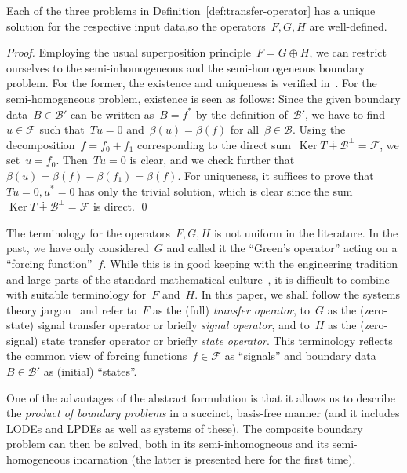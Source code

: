 \documentclass[a4paper]{llncs}
\renewcommand{\ker}{\operatorname{Ker}}
\newcommand{\orth}[1]{#1^\perp}
\newcommand{\galg}{\mathcal{F}}
\newcommand{\bspc}{\mathcal{B}}
\newenvironment{myproof}{\begin{proof}}{\qed\end{proof}}
\begin{document}
\begin{mylemma}
  Each of the three problems in Definition~\ref{def:transfer-operator} has a
  unique solution for the respective input data,so the operators~$F, G, H$ are
  well-defined.
\end{mylemma}
\begin{myproof}
  Employing the usual superposition principle~$F = G \oplus H$, we can restrict
  ourselves to the semi-inhomogeneous and the semi-homogeneous boundary
  problem. For the former, the existence and uniqueness is verified
  in~\cite[\S2]{RegensburgerRosenkranz2009}. For the semi-homogeneous problem,
  existence is seen as follows: Since the given boundary data~$B \in \bspc'$ can
  be written as~$B = f^*$ by the definition of~$\bspc'$, we have to find~$u \in
  \galg$ such that~$Tu=0$ and~$\beta(u) = \beta(f)$ for all~$\beta \in
  \bspc$. Using the decomposition~$f=f_0 + f_1$ corresponding to the direct
  sum~$\ker{T} \dotplus \orth{\bspc} = \galg$, we set~$u = f_0$. Then~$Tu=0$ is
  clear, and we check further that~$\beta(u) = \beta(f)-\beta(f_1) =
  \beta(f)$. For uniqueness, it suffices to prove that~$Tu=0, u^* = 0$ has only
  the trivial solution, which is clear since the sum~$\ker{T} \dotplus
  \orth{\bspc} = \galg$ is direct.
\end{myproof}

The terminology for the operators~$F, G, H$ is not uniform in the literature. In
the past, we have only considered~$G$ and called it the ``Green's operator''
acting on a ``forcing function''~$f$. While this is in good keeping with the
engineering tradition and large parts of the standard mathematical
culture~\cite{Stakgold1979}, it is difficult to combine with suitable
terminology for~$F$ and~$H$. In this paper, we shall follow the systems theory
jargon~\cite{OberstPauer2001} and refer to~$F$ as the (full) \emph{transfer
  operator}, to~$G$ as the (zero-state) signal transfer operator or briefly
\emph{signal operator}, and to~$H$ as the (zero-signal) state transfer operator
or briefly \emph{state operator}. This terminology reflects the common view of
forcing functions~$f \in \galg$ as ``signals'' and boundary data~$B \in \bspc'$
as (initial) ``states''.

One of the advantages of the abstract formulation is that it allows us to
describe the \emph{product of boundary problems} in a succinct, basis-free
manner (and it includes LODEs and LPDEs as well as systems of these). The
composite boundary problem can then be solved, both in its semi-inhomogneous and
its semi-homogeneous incarnation (the latter is presented here for the first
time).
\end{document}
